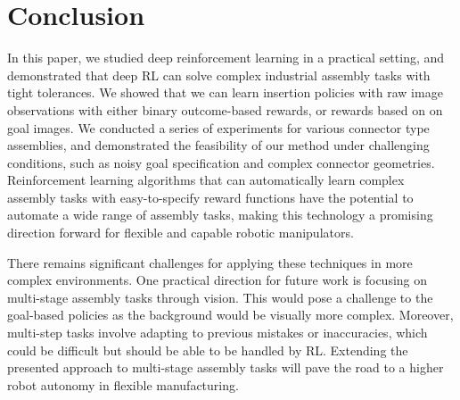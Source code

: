\section{Conclusion}\label{sec:discussion}
In this paper, we studied deep reinforcement learning in a practical setting, and demonstrated that deep RL can solve complex industrial assembly tasks with tight tolerances.
We showed that we can learn insertion policies with raw image observations with either binary outcome-based rewards, or rewards based on on goal images.
We conducted a series of experiments for various connector type assemblies, and demonstrated the feasibility of our method under challenging conditions, such as noisy goal specification and complex connector geometries.
Reinforcement learning algorithms that can automatically learn complex assembly tasks with easy-to-specify reward functions have the potential to automate a wide range of assembly tasks, making this technology a promising direction forward for flexible and capable robotic manipulators.

There remains significant challenges for applying these techniques in more complex environments. One practical direction for future work is focusing on multi-stage assembly tasks through vision. This would pose a challenge to the goal-based policies as the background would be visually more complex. Moreover, multi-step tasks involve adapting to previous mistakes or inaccuracies, which could be difficult but should be able to be handled by RL. 
Extending the presented approach to multi-stage assembly tasks will pave the road to a higher robot autonomy in flexible manufacturing.

